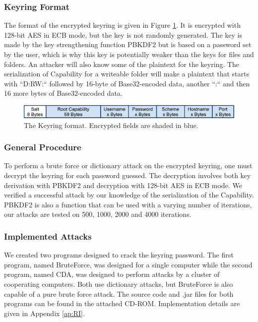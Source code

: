 \documentclass[pdftex,english,10pt,b5paper,twoside]{book}
\begin{document}
\subsubsection{Keyring Format} The format of the encrypted keyring is given in
Figure \ref{fig:KeyringFormat}.  It is encrypted with 128-bit \ac{AES} in
\ac{ECB} mode, but the key is not randomly generated.  The key is made by the
key strengthening function \ac{PBKDF2} but is based on a password set by the
user, which is why this key is potentially weaker than the keys for files and
folders. An attacker will also know some of the plaintext for the keyring. The
serialization of Capability for a writeable folder will make a plaintext that
starts with ``D:RW:`` followed by 16-byte of Base32-encoded data, another ``:``
and then 16 more bytes of Base32-encoded data. 

\begin{figure}[h!]
    \centering
    \includegraphics[scale=0.6]{KeyringFormat.pdf}
    \caption{The Keyring format. Encrypted fields are shaded in blue.}
    \label{fig:KeyringFormat}
\end{figure}

\subsubsection{General Procedure} To perform a brute force or dictionary attack
on the encrypted keyring, one must decrypt the keyring for each password
guessed. The decryption involves both key derivation with \ac{PBKDF2} and
decryption with 128-bit \ac{AES} in \ac{ECB} mode. We verified a successful
attack by our knowledge of the serialization of the Capability. \ac{PBKDF2} is
also a function that can be used with a varying number of iterations, our
attacks are tested on 500, 1000, 2000 and 4000 iterations.

\subsubsection{Implemented Attacks} We created two programs designed to crack
the keyring password. The first program, named BruteForce, was designed for a
single computer while the second program, named \ac{CDA}, was designed to
perform attacks by a cluster of cooperating computers. Both use dictionary
attacks, but BruteForce is also capable of a pure brute force attack. The
source code and .jar files for both programs can be found in the attached
CD-ROM. Implementation details are given in Appendix \ref{ap:RI}.
\end{document}
